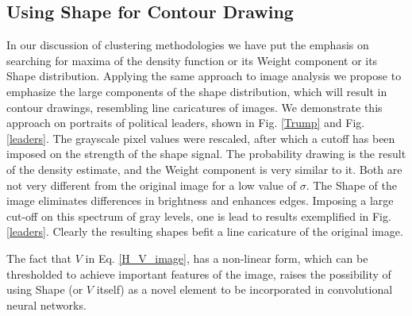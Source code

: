 \documentclass[preprint,12pt]{elsarticle}
\begin{document}
\subsection{Using Shape for Contour Drawing}
\label{contour}
In our discussion of clustering methodologies we have put the emphasis on searching for maxima of the density function or its Weight component or its Shape distribution. Applying the same approach to image analysis we propose to emphasize the large components of the shape distribution, which will result in contour drawings, resembling line caricatures of images.
We demonstrate this approach on portraits of political leaders, shown in Fig. \ref{Trump} and Fig. \ref{leaders}. The grayscale pixel values were rescaled, after which a cutoff has been imposed on the strength of the shape signal. The probability drawing is the result of the density estimate, and the Weight component is very similar to it. Both are not very different from the original image for a low value of $\sigma$. The Shape of the image eliminates differences in brightness and enhances edges. Imposing a large cut-off on this spectrum of gray levels, one is lead to results exemplified in Fig. \ref{leaders}. Clearly the resulting shapes befit a line caricature of the original image.

The fact that $V$ in Eq. \ref{H_V_image}, has a non-linear form, which can be thresholded to achieve important features of the image, raises the possibility of using Shape (or $V$ itself) as a novel element to be incorporated in convolutional neural networks.
\end{document}
